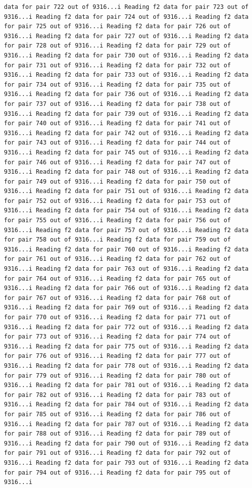 \documentclass[
]{article}
\begin{document}
\begin{verbatim}
data for pair 722 out of 9316...i Reading f2 data for pair 723 out of 9316...i Reading f2 data for pair 724 out of 9316...i Reading f2 data for pair 725 out of 9316...i Reading f2 data for pair 726 out of 9316...i Reading f2 data for pair 727 out of 9316...i Reading f2 data for pair 728 out of 9316...i Reading f2 data for pair 729 out of 9316...i Reading f2 data for pair 730 out of 9316...i Reading f2 data for pair 731 out of 9316...i Reading f2 data for pair 732 out of 9316...i Reading f2 data for pair 733 out of 9316...i Reading f2 data for pair 734 out of 9316...i Reading f2 data for pair 735 out of 9316...i Reading f2 data for pair 736 out of 9316...i Reading f2 data for pair 737 out of 9316...i Reading f2 data for pair 738 out of 9316...i Reading f2 data for pair 739 out of 9316...i Reading f2 data for pair 740 out of 9316...i Reading f2 data for pair 741 out of 9316...i Reading f2 data for pair 742 out of 9316...i Reading f2 data for pair 743 out of 9316...i Reading f2 data for pair 744 out of 9316...i Reading f2 data for pair 745 out of 9316...i Reading f2 data for pair 746 out of 9316...i Reading f2 data for pair 747 out of 9316...i Reading f2 data for pair 748 out of 9316...i Reading f2 data for pair 749 out of 9316...i Reading f2 data for pair 750 out of 9316...i Reading f2 data for pair 751 out of 9316...i Reading f2 data for pair 752 out of 9316...i Reading f2 data for pair 753 out of 9316...i Reading f2 data for pair 754 out of 9316...i Reading f2 data for pair 755 out of 9316...i Reading f2 data for pair 756 out of 9316...i Reading f2 data for pair 757 out of 9316...i Reading f2 data for pair 758 out of 9316...i Reading f2 data for pair 759 out of 9316...i Reading f2 data for pair 760 out of 9316...i Reading f2 data for pair 761 out of 9316...i Reading f2 data for pair 762 out of 9316...i Reading f2 data for pair 763 out of 9316...i Reading f2 data for pair 764 out of 9316...i Reading f2 data for pair 765 out of 9316...i Reading f2 data for pair 766 out of 9316...i Reading f2 data for pair 767 out of 9316...i Reading f2 data for pair 768 out of 9316...i Reading f2 data for pair 769 out of 9316...i Reading f2 data for pair 770 out of 9316...i Reading f2 data for pair 771 out of 9316...i Reading f2 data for pair 772 out of 9316...i Reading f2 data for pair 773 out of 9316...i Reading f2 data for pair 774 out of 9316...i Reading f2 data for pair 775 out of 9316...i Reading f2 data for pair 776 out of 9316...i Reading f2 data for pair 777 out of 9316...i Reading f2 data for pair 778 out of 9316...i Reading f2 data for pair 779 out of 9316...i Reading f2 data for pair 780 out of 9316...i Reading f2 data for pair 781 out of 9316...i Reading f2 data for pair 782 out of 9316...i Reading f2 data for pair 783 out of 9316...i Reading f2 data for pair 784 out of 9316...i Reading f2 data for pair 785 out of 9316...i Reading f2 data for pair 786 out of 9316...i Reading f2 data for pair 787 out of 9316...i Reading f2 data for pair 788 out of 9316...i Reading f2 data for pair 789 out of 9316...i Reading f2 data for pair 790 out of 9316...i Reading f2 data for pair 791 out of 9316...i Reading f2 data for pair 792 out of 9316...i Reading f2 data for pair 793 out of 9316...i Reading f2 data for pair 794 out of 9316...i Reading f2 data for pair 795 out of 9316...i 
\end{verbatim}
\end{document}
